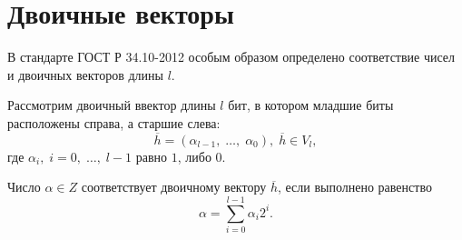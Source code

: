 \section{Двоичные векторы}
В стандарте ГОСТ Р 34.10-2012 особым образом определено соответствие чисел и двоичных векторов длины $l$.
\par
Рассмотрим двоичный ввектор длины $l$ бит, в котором младшие биты расположены справа, а старшие слева:
\begin{equation}\label{eq:bv1}
\overline{h}=(\alpha_{l-1},\;\dots,\;\alpha_0),\;\overline{h}\in V_l,
\end{equation}
где $\alpha_i,\;i=0,\;\dots,\;l-1$ равно $1$, либо $0$.
\par
Число $\alpha \in Z$ соответствует двоичному вектору $\overline{h}$, если выполнено равенство
\begin{equation}\label{eq:bv2}
\alpha = \sum_{i=0}^{l-1}\alpha_i2^i.
\end{equation} 
